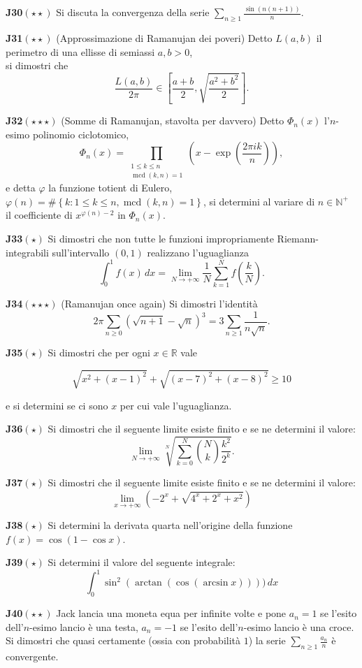 \documentclass[a4paper,twoside]{article}
\renewcommand{\gcd}{\operatorname{mcd}}
\theoremstyle{definition}
\numberwithin{theorem}{section}
\begin{document}
\textbf{J30}$(\star\star)$ Si discuta la convergenza della serie $\sum_{n\geq 1}\frac{\sin(n(n+1))}{n}$. 

\textbf{J31}$(\star\star)$ (Approssimazione di Ramanujan dei poveri) Detto $L(a,b)$ il perimetro di una ellisse di semiassi $a,b > 0$,\\ si dimostri che 
$$ \frac{L(a,b)}{2\pi}\in\left[\frac{a+b}{2},\sqrt{\frac{a^2+b^2}{2}}\right]. $$

\textbf{J32}$(\star\star\star)$ (Somme di Ramanujan, stavolta per davvero) Detto $\Phi_n(x)$ l'$n$-esimo polinomio ciclotomico, 
$$\Phi_n(x) = \prod_{\substack{1\leq k\leq n\\\gcd(k,n)=1}}\left(x-\exp\left(\frac{2\pi i k}{n}\right)\right),$$ e detta $\varphi$ la funzione totient di Eulero, $\varphi(n)=\#\left\{k:1\leq k\leq n, \gcd(k,n)=1\right\}$, si determini al variare di $n\in\mathbb{N}^+$\\ il coefficiente di $x^{\varphi(n)-2}$ in $\Phi_n(x)$.

\textbf{J33}$(\star)$ Si dimostri che non tutte le funzioni impropriamente Riemann-integrabili sull'intervallo $(0,1)$ realizzano l'uguaglianza
$$ \int_{0}^{1}f(x)\,dx = \lim_{N\to +\infty}\frac{1}{N}\sum_{k=1}^{N}f\left(\frac{k}{N}\right).$$

\textbf{J34}$(\star\star\star)$ (Ramanujan once again) Si dimostri l'identità
$$ 2\pi\sum_{n\geq 0}\left(\sqrt{n+1}-\sqrt{n}\right)^3 = 3\sum_{n\geq 1}\frac{1}{n\sqrt{n}}.$$

\textbf{J35}$(\star)$ Si dimostri che per ogni $x\in\mathbb{R}$ vale

$$ \sqrt{x^2+(x-1)^2}+\sqrt{(x-7)^2+(x-8)^2}\geq 10 $$

e si determini se ci sono $x$ per cui vale l'uguaglianza.

\textbf{J36}$(\star)$ Si dimostri che il seguente limite esiste finito e se ne determini il valore:
$$ \lim_{N\to +\infty}\sqrt[N]{\sum_{k=0}^{N}\binom{N}{k}\frac{k^2}{2^k}}.$$

\textbf{J37}$(\star)$ Si dimostri che il seguente limite esiste finito e se ne determini il valore:
$$ \lim_{x\to +\infty} \left(-2^x+\sqrt{4^x+2^x+x^2}\right) $$

\textbf{J38}$(\star)$ Si determini la derivata quarta nell'origine della funzione $f(x)=\cos(1-\cos x)$.

\textbf{J39}$(\star)$ Si determini il valore del seguente integrale:
$$ \int_{0}^{1}\sin^2(\arctan(\cos(\arcsin x))))\,dx $$ 

\textbf{J40}$(\star\star)$ Jack lancia una moneta equa per infinite volte e pone $a_n=1$ se l'esito dell'$n$-esimo lancio è una testa, $a_n=-1$ se l'esito dell'$n$-esimo lancio è una croce. Si dimostri che quasi certamente (ossia con probabilità $1$) la serie $\sum_{n\geq 1}\frac{a_n}{n}$ è convergente.
\end{document}

